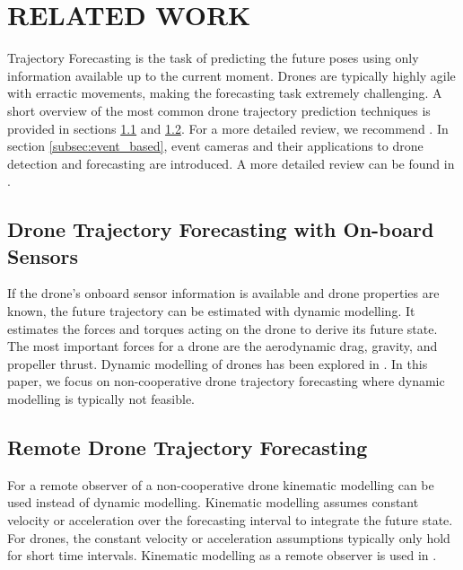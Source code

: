 \documentclass[letterpaper, 10 pt, conference]{ieeeconf}  %
\begin{document}


\section{RELATED WORK}\label{sec:related_work}


Trajectory Forecasting is the task of predicting the future poses using only information available up to the current moment. Drones are typically highly agile with erractic movements, making the forecasting task extremely challenging. A short overview of the most common drone trajectory prediction techniques is provided in sections \ref{sec:on-board-prediciton} and \ref{sec:remote-prediction}. For a more detailed review, we recommend \cite{shukla2024trajectory}. In section \ref{subsec:event_based}, event cameras and their applications to drone detection and forecasting are introduced. A more detailed review can be found in \cite{magrini_drone_2025}. 

\subsection{Drone Trajectory Forecasting with On-board Sensors}\label{sec:on-board-prediciton}
If the drone's onboard sensor information is available and drone properties are known, the future trajectory can be estimated with dynamic modelling. It estimates the forces and torques acting on the drone to derive its future state. The most important forces for a drone are the aerodynamic drag, gravity, and propeller thrust. Dynamic modelling of drones has been explored in \cite{kamel2017dynamic,chovancova2014mathematical}. In this paper, we focus on non-cooperative drone trajectory forecasting where dynamic modelling is typically not feasible. 

\subsection{Remote Drone Trajectory Forecasting}\label{sec:remote-prediction}
For a remote observer of a non-cooperative drone kinematic modelling can be used instead of dynamic modelling.  Kinematic modelling assumes constant velocity or acceleration over the forecasting interval to integrate the future state. 
For drones, the constant velocity or acceleration assumptions typically only hold for short time intervals. Kinematic modelling as a remote observer is used in \cite{peng2018unified}. 
\end{document}
